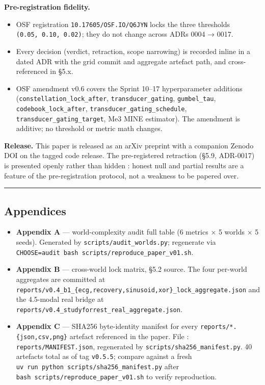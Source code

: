 \documentclass[
]{article}
\providecommand{\tightlist}{%
  \setlength{\itemsep}{0pt}\setlength{\parskip}{0pt}}
\begin{document}
\textbf{Pre-registration fidelity.}

\begin{itemize}
\tightlist
\item
  OSF registration \texttt{10.17605/OSF.IO/Q6JYN} locks the three
  thresholds \texttt{(0.05,\ 0.10,\ 0.02)}; they do not change across
  ADRs 0004 → 0017.
\item
  Every decision (verdict, retraction, scope narrowing) is recorded
  inline in a dated ADR with the grid commit and aggregate artefact
  path, and cross-referenced in §5.x.
\item
  OSF amendment v0.6 covers the Sprint 10--17 hyperparameter additions
  (\texttt{constellation\_lock\_after}, \texttt{transducer\_gating},
  \texttt{gumbel\_tau}, \texttt{codebook\_lock\_after},
  \texttt{transducer\_gating\_schedule},
  \texttt{transducer\_gating\_target}, Me3 MINE estimator). The
  amendment is additive; no threshold or metric math changes.
\end{itemize}

\textbf{Release.} This paper is released as an arXiv preprint with a
companion Zenodo DOI on the tagged code release. The pre-registered
retraction (§5.9, ADR-0017) is presented openly rather than hidden :
honest null and partial results are a feature of the pre-registration
protocol, not a weakness to be papered over.

\begin{center}\rule{0.5\linewidth}{0.5pt}\end{center}

\subsection{Appendices}\label{appendices}

\begin{itemize}
\tightlist
\item
  \textbf{Appendix A} --- world-complexity audit full table (6 metrics ×
  5 worlds × 5 seeds). Generated by \texttt{scripts/audit\_worlds.py};
  regenerate via
  \texttt{CHOOSE=audit\ bash\ scripts/reproduce\_paper\_v01.sh}.
\item
  \textbf{Appendix B} --- cross-world lock matrix, §5.2 source. The four
  per-world aggregates are committed at
  \texttt{reports/v0.4\_b1\_\{ecg,recovery,sinusoid,xor\}\_lock\_aggregate.json}
  and the 4.5-modal real bridge at
  \texttt{reports/v0.4\_studyforrest\_real\_aggregate.json}.
\item
  \textbf{Appendix C} --- SHA256 byte-identity manifest for every
  \texttt{reports/*.\{json,csv,png\}} artefact referenced in the paper.
  File : \texttt{reports/MANIFEST.json}, regenerated by
  \texttt{scripts/sha256\_manifest.py}. 40 artefacts total as of tag
  \texttt{v0.5.5}; compare against a fresh
  \texttt{uv\ run\ python\ scripts/sha256\_manifest.py} after
  \texttt{bash\ scripts/reproduce\_paper\_v01.sh} to verify
  reproduction.
\end{itemize}
\end{document}
